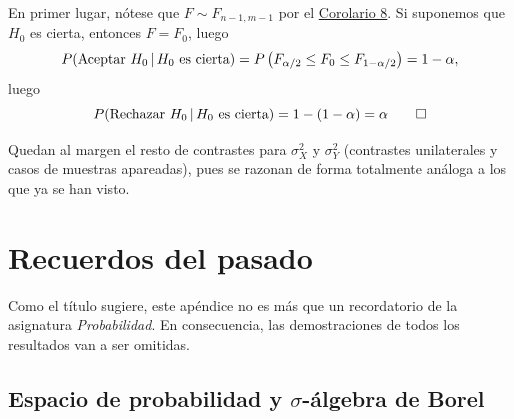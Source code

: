 \documentclass[11pt]{report}
\makeatletter
\renewenvironment{proof}[1][\proofname]{\par
  \pushQED{\qed}%
  \normalfont \topsep\z@skip %
  \trivlist
  \item[\hskip\labelsep
        \itshape
    #1\@addpunct{.}]\ignorespaces
}{%
  \popQED\endtrivlist\@endpefalse
}
\theoremstyle{definition}
\makeatother
\begin{document}
\begin{proof}
    En primer lugar, nótese que $F \sim F_{n-1,m-1}$ por el \hyperref[cor8]{\color{blue}Corolario 8}. Si suponemos que $H_0$ es cierta, entonces $F = F_0$, luego
    \[P(\textup{Aceptar } H_0 \, | \, H_0 \textup{ es cierta}) = P\left(F_{\alpha/2} \leq F_0 \leq F_{1-\alpha/2}\right) = 1-\alpha,\]
    luego
    \[P(\textup{Rechazar } H_0 \, | \, H_0 \textup{ es cierta}) = 1-(1-\alpha) = \alpha \qedhere\]
\end{proof}

Quedan al margen el resto de contrastes para $\sigma^2_X$ y $\sigma^2_Y$ (contrastes unilaterales y casos de muestras apareadas), pues se razonan de forma totalmente análoga a los que ya se han visto.




















\clearpage

\appendix


\chapter{Recuerdos del pasado}

Como el título sugiere, este apéndice no es más que un recordatorio de la asignatura \emph{Probabilidad}. En consecuencia, las demostraciones de todos los resultados van a ser omitidas.

\section{Espacio de probabilidad y \texorpdfstring{$\sigma$}{TEXT}-álgebra de Borel}
\end{document}
